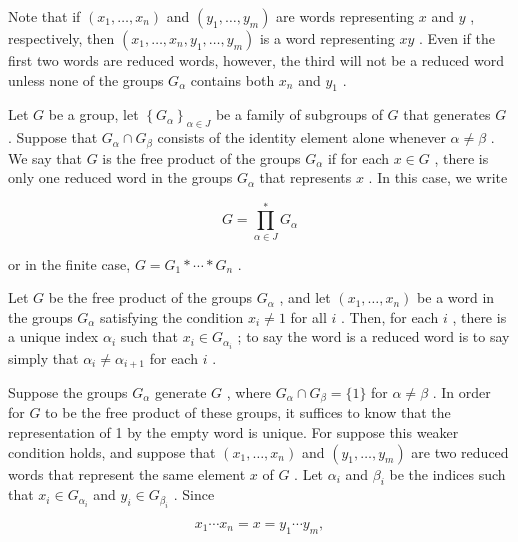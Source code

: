 Note that if \(\left( {{x}_{1},\ldots ,{x}_{n}}\right)\) and \(\left( {{y}_{1},\ldots ,{y}_{m}}\right)\) are words representing \(x\) and \(y\) , respectively, then \(\left( {{x}_{1},\ldots ,{x}_{n},{y}_{1},\ldots ,{y}_{m}}\right)\) is a word representing \({xy}\) . Even if the first two words are reduced words, however, the third will not be a reduced word unless none of the groups \({G}_{\alpha }\) contains both \({x}_{n}\) and \({y}_{1}\) .

\begin{definition} Let \(G\) be a group, let \({\left\{  {G}_{\alpha }\right\}  }_{\alpha  \in  J}\) be a family of subgroups of \(G\) that generates \(G\) . Suppose that \({G}_{\alpha } \cap  {G}_{\beta }\) consists of the identity element alone whenever \(\alpha  \neq  \beta\) . We say that \(G\) is the free product of the groups \({G}_{\alpha }\) if for each \(x \in  G\) , there is only one reduced word in the groups \({G}_{\alpha }\) that represents \(x\) . In this case, we write

\[
G = \mathop{\prod }\limits_{{\alpha  \in  J}}^{ * }{G}_{\alpha }
\]

or in the finite case, \(G = {G}_{1} * \cdots  * {G}_{n}\) .
\end{definition}

Let \(G\) be the free product of the groups \({G}_{\alpha }\) , and let \(\left( {{x}_{1},\ldots ,{x}_{n}}\right)\) be a word in the groups \({G}_{\alpha }\) satisfying the condition \({x}_{i} \neq  1\) for all \(i\) . Then, for each \(i\) , there is a unique index \({\alpha }_{i}\) such that \({x}_{i} \in  {G}_{{\alpha }_{i}}\) ; to say the word is a reduced word is to say simply that \({\alpha }_{i} \neq  {\alpha }_{i + 1}\) for each \(i\) .

Suppose the groups \({G}_{\alpha }\) generate \(G\) , where \({G}_{\alpha } \cap  {G}_{\beta } = \{ 1\}\) for \(\alpha  \neq  \beta\) . In order for \(G\) to be the free product of these groups, it suffices to know that the representation of 1 by the empty word is unique. For suppose this weaker condition holds, and suppose that \(\left( {{x}_{1},\ldots ,{x}_{n}}\right)\) and \(\left( {{y}_{1},\ldots ,{y}_{m}}\right)\) are two reduced words that represent the same element \(x\) of \(G\) . Let \({\alpha }_{i}\) and \({\beta }_{i}\) be the indices such that \({x}_{i} \in  {G}_{{\alpha }_{i}}\) and \({y}_{i} \in  {G}_{{\beta }_{i}}\) . Since

\[
{x}_{1}\cdots {x}_{n} = x = {y}_{1}\cdots {y}_{m},
\]

